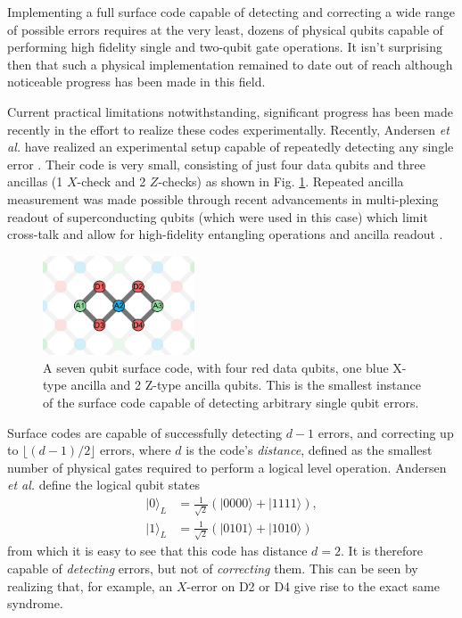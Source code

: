 Implementing a full surface code capable of detecting and correcting a wide
range of possible errors requires at the very least, dozens of physical qubits
capable of performing high fidelity single and two-qubit gate operations. It
isn't surprising then that such a physical implementation remained to date out
of reach although noticeable progress has been made in this field.

Current practical limitations notwithstanding, significant progress has been
made recently in the effort to realize these codes experimentally. Recently,
Andersen \textit{et al.} have realized an experimental setup capable of
repeatedly detecting any single error \cite{Andersen_2020}. Their code is very
small, consisting of just four data qubits and three ancillas (1 $X$-check and 2
$Z$-checks) as shown in Fig. \ref{fig:seven_qbit_code}. Repeated ancilla
measurement was made possible through recent advancements in multi-plexing
readout of superconducting qubits (which were used in this case) which limit
cross-talk and allow for high-fidelity entangling operations and ancilla readout
\cite{barends14_super_quant_circuit_at_surfac} \cite{Bultink_2020}.

\begin{figure}[h]
  \centering
  \includegraphics[width=0.4\textwidth]{images/seven_qbit_code.png}
  \caption{A seven qubit surface code, with four red data qubits, one blue
    X-type ancilla and 2 Z-type ancilla qubits. This is the smallest instance of
    the surface code capable of detecting arbitrary single qubit errors.}
  \label{fig:seven_qbit_code}
\end{figure}

Surface codes are capable of successfully detecting $d-1$ errors, and correcting
up to $\lfloor{(d-1)/2} \rfloor$ errors, where $d$ is the code's
\textit{distance}, defined as the smallest number of physical gates required to
perform a logical level operation. Andersen \textit{et al.} define the logical
qubit states
\begin{align}
|0\rangle_L &= \frac{1}{\sqrt{2}} (|0000\rangle + |1111\rangle) , \\
|1\rangle_L &= \frac{1}{\sqrt{2}} (|0101\rangle + |1010\rangle) 
\end{align}
from which it is easy to see that this code has distance $d=2$. It is therefore
capable of \textit{detecting} errors, but not of \textit{correcting} them. This
can be seen by realizing that, for example, an $X$-error on D2 or D4 give rise
to the exact same syndrome.

